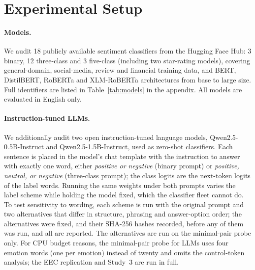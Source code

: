 \documentclass[runningheads]{llncs}
\begin{document}
\section{Experimental Setup}\label{sec:exp}
\paragraph{Models.} We audit 18 publicly available sentiment classifiers from
the Hugging Face Hub: 3 binary, 12 three-class and 3 five-class (including two
star-rating models), covering general-domain, social-media, review and
financial training data, and BERT, DistilBERT, RoBERTa and XLM-RoBERTa
architectures from base to large size. Full identifiers are listed in
Table~\ref{tab:models} in the appendix. All models are evaluated in English only.

\paragraph{Instruction-tuned LLMs.} We additionally audit two open
instruction-tuned language models, Qwen2.5-0.5B-Instruct and
Qwen2.5-1.5B-Instruct, used as zero-shot classifiers. Each sentence is placed in
the model's chat template with the instruction to answer with exactly one word,
either \emph{positive or negative} (binary prompt) or \emph{positive, neutral,
or negative} (three-class prompt); the class logits are the next-token logits of
the label words. Running the same weights under both prompts varies the label
scheme while holding the model fixed, which the classifier fleet cannot do. To
test sensitivity to wording, each scheme is run with the original prompt and
two alternatives that differ in structure, phrasing and answer-option order;
the alternatives were fixed, and their SHA-256 hashes recorded, before any of
them was run, and all are reported. The alternatives are run on the
minimal-pair probe only. For
CPU budget reasons, the minimal-pair probe for LLMs uses four emotion words (one
per emotion) instead of twenty and omits the control-token analysis; the EEC
replication and Study~3 are run in full.
\end{document}
